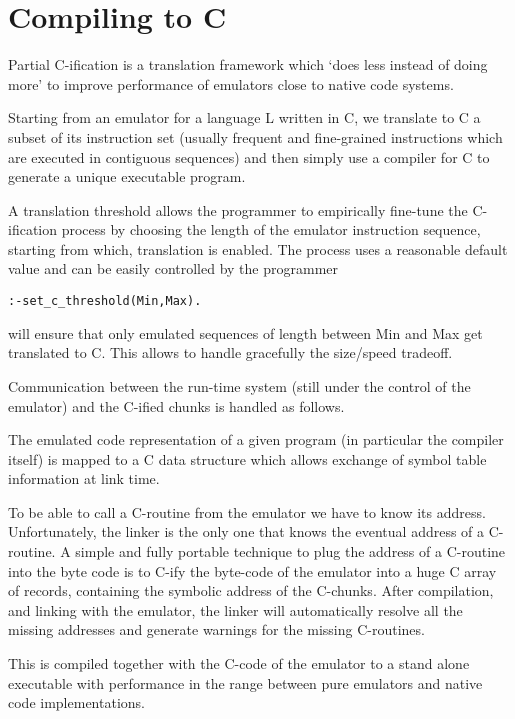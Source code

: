 \documentclass{article}
\begin{document}
\section{Compiling to C}

Partial C-ification \cite{tdb95} is a translation framework which
`does less instead of doing more' to improve performance of emulators
close to native code systems.

Starting from an emulator for a language L written in C, we translate
to C a
subset of its instruction set (usually frequent and fine-grained
instructions which are executed in contiguous sequences)
and then simply use a compiler for C
to generate a unique executable program.

A translation threshold allows the programmer
to empirically fine-tune the C-ification
process by choosing the length of the
emulator instruction sequence, starting from which,
translation is enabled. The process uses
a reasonable default value and can be easily controlled
by the programmer

\begin{verbatim}
:-set_c_threshold(Min,Max).
\end{verbatim}

will ensure that only emulated sequences of length between
Min and Max get translated to C. This allows to handle gracefully
the size/speed tradeoff. 

Communication between the run-time system (still
under the control of the emulator) and the C-ified
chunks is handled as follows.

The emulated code representation of a given
program (in particular the compiler itself)
is mapped to a C
data structure which allows exchange of symbol table
information at link time.

To be able to call a C-routine from the emulator we have to
know its address. Unfortunately, the linker is the only one that knows
the eventual address of a C-routine.
A simple and fully portable technique to plug the address of a 
C-routine into the byte code is to C-ify the byte-code 
of the emulator into a huge C array of records, containing the
symbolic address of the C-chunks. After compilation, and linking
with the emulator, the 
linker will automatically resolve all the missing addresses and 
generate warnings for the missing C-routines.

This is compiled together with the C-code of the emulator
to a stand alone executable with
performance in the range between
pure emulators and native code implementations.
\end{document}
